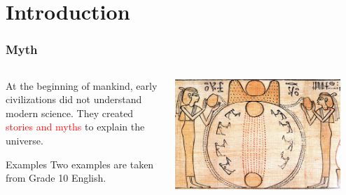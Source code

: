 \documentclass[aspectratio=1611, 9pt]{beamer}
\begin{document}
\section{Introduction}
\begin{frame}
  \frametitle{Myth}
  \begin{columns}
    \begin{center}
      At the beginning of mankind, early civilizations did not understand modern science. 
      They created \textcolor{red}{stories and myths} to explain the universe.
      
      \begin{exampleblock}{Examples}
        Two examples are taken from Grade 10 English.
      \end{exampleblock}
    \end{center}

    \begin{center}
      \includegraphics[width=0.9\textwidth]{pictures/myth1.jpg}
    \end{center}
  \end{columns}
\end{frame}
\end{document}
